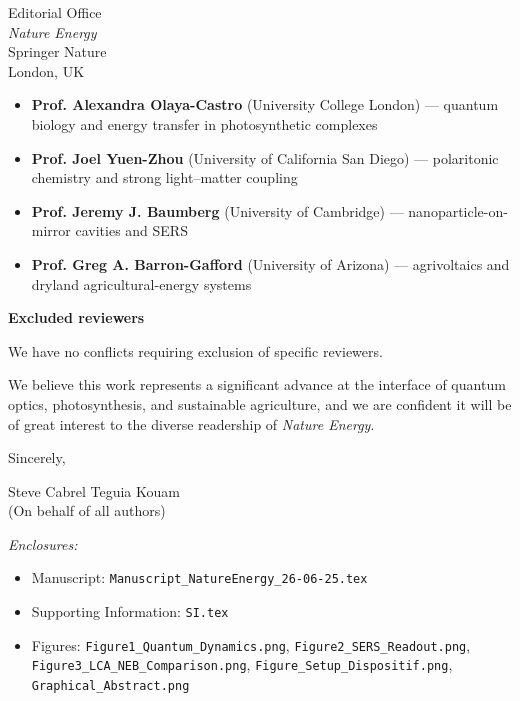 \documentclass[12pt]{letter}
\begin{document}
\begin{letter}{Editorial Office\\
\textit{Nature Energy}\\
Springer Nature\\
London, UK}
\begin{itemize}
\item \textbf{Prof. Alexandra Olaya-Castro} (University College London) --- quantum biology and energy transfer in photosynthetic complexes
\item \textbf{Prof. Joel Yuen-Zhou} (University of California San Diego) --- polaritonic chemistry and strong light--matter coupling
\item \textbf{Prof. Jeremy J. Baumberg} (University of Cambridge) --- nanoparticle-on-mirror cavities and SERS
\item \textbf{Prof. Greg A. Barron-Gafford} (University of Arizona) --- agrivoltaics and dryland agricultural-energy systems
\end{itemize}

\noindent\textbf{Excluded reviewers}

We have no conflicts requiring exclusion of specific reviewers.

\vspace{2em}

We believe this work represents a significant advance at the interface of quantum optics, photosynthesis, and sustainable agriculture, and we are confident it will be of great interest to the diverse readership of \textit{Nature Energy}.

\closing{Sincerely,}

\vspace{1em}

Steve Cabrel Teguia Kouam\\
(On behalf of all authors)

\vspace{1em}
\textit{Enclosures:}
\begin{itemize}
\item Manuscript: \texttt{Manuscript\_NatureEnergy\_26-06-25.tex}
\item Supporting Information: \texttt{SI.tex}
\item Figures: \texttt{Figure1\_Quantum\_Dynamics.png}, \texttt{Figure2\_SERS\_Readout.png}, \texttt{Figure3\_LCA\_NEB\_Comparison.png}, \texttt{Figure\_Setup\_Dispositif.png}, \texttt{Graphical\_Abstract.png}
\end{itemize}

\end{letter}
\end{document}
